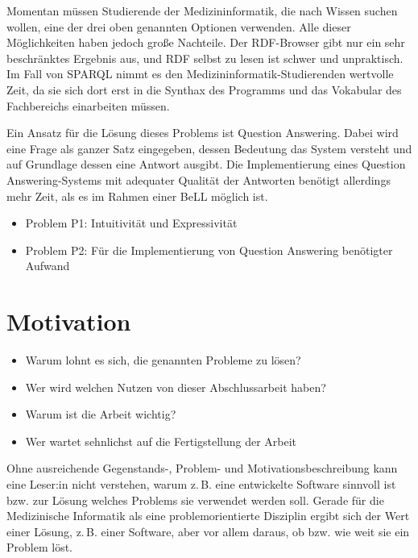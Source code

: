 Momentan müssen Studierende der Medizininformatik, die nach Wissen suchen wollen, eine der drei oben genannten Optionen verwenden.
Alle dieser Möglichkeiten haben jedoch große Nachteile. Der RDF-Browser gibt nur ein sehr beschränktes Ergebnis aus, und RDF selbst zu lesen ist schwer und unpraktisch.
Im Fall von SPARQL nimmt es den Medizininformatik-Studierenden wertvolle Zeit, da sie sich dort erst in die Synthax des Programms und das Vokabular des Fachbereichs einarbeiten müssen.

Ein Ansatz für die Lösung dieses Problems ist Question Answering.
Dabei wird eine Frage als ganzer Satz eingegeben, dessen Bedeutung das System versteht und auf Grundlage dessen eine Antwort ausgibt.
Die Implementierung eines Question Answering-Systems mit adequater Qualität der Antworten benötigt allerdings mehr Zeit, als es im Rahmen einer BeLL möglich ist.

\begin{itemize}
\item Problem P1: Intuitivität und Expressivität
\item Problem P2: Für die Implementierung von Question Answering benötigter Aufwand
\end{itemize}


\section{Motivation}

\begin{itemize}
\item Warum lohnt es sich, die genannten Probleme zu lösen?
\item Wer wird welchen Nutzen von dieser Abschlussarbeit haben?
\item Warum ist die Arbeit wichtig?
\item Wer wartet sehnlichst auf die Fertigstellung der Arbeit
\end{itemize}

Ohne ausreichende Gegenstands-, Problem- und Motivationsbeschreibung kann eine Leser:in nicht verstehen, warum z.\,B. eine entwickelte Software sinnvoll ist bzw. zur Lösung welches Problems sie verwendet werden soll.
Gerade für die Medizinische Informatik als eine problemorientierte Disziplin ergibt sich der Wert einer Lösung, z.\,B. einer Software, aber vor allem daraus, ob bzw. wie weit sie ein Problem löst.

